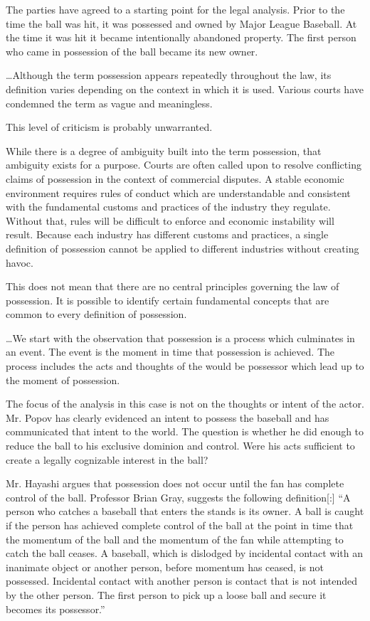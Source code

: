 The parties have agreed to a starting point for the legal analysis. Prior to the
time the ball was hit, it was possessed and owned by Major League Baseball. At
the time it was hit it became intentionally abandoned property. The first person
who came in possession of the ball became its new owner. 

\ldots Although the term possession appears repeatedly throughout the law, its
definition varies depending on the context in which it is used. Various courts
have condemned the term as vague and meaningless. 

This level of criticism is probably unwarranted.

While there is a degree of ambiguity built into the term possession, that
ambiguity exists for a purpose. Courts are often called upon to resolve
conflicting claims of possession in the context of commercial disputes. A stable
economic environment requires rules of conduct which are understandable and
consistent with the fundamental customs and practices of the industry they
regulate. Without that, rules will be difficult to enforce and economic
instability will result. Because each industry has different customs and
practices, a single definition of possession cannot be applied to different
industries without creating havoc.

This does not mean that there are no central principles governing the law of
possession. It is possible to identify certain fundamental concepts that are
common to every definition of possession.

\ldots We start with the observation that possession is a process which
culminates in an event. The event is the moment in time that possession is
achieved. The process includes the acts and thoughts of the would be possessor
which lead up to the moment of possession.

The focus of the analysis in this case is not on the thoughts or intent of the
actor. Mr. Popov has clearly evidenced an intent to possess the baseball and has
communicated that intent to the world. The
question is whether he did enough to reduce the ball to his exclusive dominion
and control. Were his acts sufficient to create a legally cognizable interest in
the ball?

Mr. Hayashi argues that possession does not occur until the fan has complete
control of the ball. Professor Brian Gray, suggests the following definition[:]
``A person who catches a baseball that enters the stands is its owner. A ball is
caught if the person has achieved complete control of the ball at the point in
time that the momentum of the ball and the momentum of the fan while attempting
to catch the ball ceases. A baseball, which is dislodged by incidental contact
with an inanimate object or another person, before momentum has ceased, is not
possessed. Incidental contact with another person is contact that is not
intended by the other person. The first person to pick up a loose ball and
secure it becomes its possessor.''

